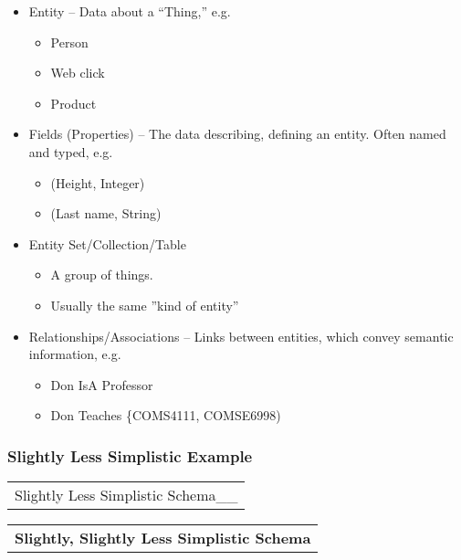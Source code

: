 \documentclass[11pt]{article}
\providecommand{\tightlist}{%
      \setlength{\itemsep}{0pt}\setlength{\parskip}{0pt}}
\begin{document}
\begin{itemize}
\tightlist
\item
  Entity -- Data about a ``Thing,'' e.g.

  \begin{itemize}
  \tightlist
  \item
    Person
  \item
    Web click
  \item
    Product
  \end{itemize}
\item
  Fields (Properties) -- The data describing, defining an entity. Often
  named and typed, e.g.

  \begin{itemize}
  \tightlist
  \item
    (Height, Integer)
  \item
    (Last name, String)
  \end{itemize}
\item
  Entity Set/Collection/Table

  \begin{itemize}
  \tightlist
  \item
    A group of things.
  \item
    Usually the same ''kind of entity''
  \end{itemize}
\item
  Relationships/Associations -- Links between entities, which convey
  semantic information, e.g.

  \begin{itemize}
  \tightlist
  \item
    Don IsA Professor
  \item
    Don Teaches \{COMS4111, COMSE6998)
  \end{itemize}
\end{itemize}

\subsubsection{Slightly Less Simplistic
Example}\label{slightly-less-simplistic-example}

\begin{longtable}[]{@{}c@{}}
\toprule
\tabularnewline
\midrule
\endhead
Slightly Less Simplistic Schema\_\_\tabularnewline
\bottomrule
\end{longtable}

\begin{longtable}[]{@{}c@{}}
\toprule
\tabularnewline
\midrule
\endhead
\textbf{Slightly, Slightly Less Simplistic Schema}\tabularnewline
\bottomrule
\end{longtable}
\end{document}
